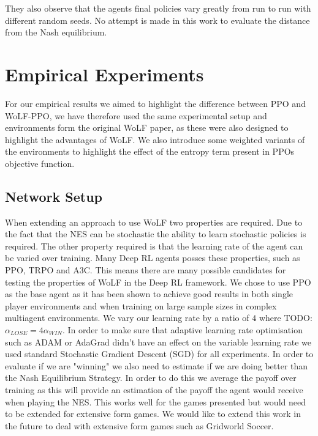 \documentclass[conference]{IEEEtran}
\newcommand\TODO[1]{{\color{red}TODO: #1}}
\begin{document}
They also observe that the agents final policies vary greatly from run to run with different random seeds. No attempt is made in this work to evaluate the distance from the Nash equilibrium. 

\section{Empirical Experiments}

For our empirical results we aimed to highlight the difference between PPO and WoLF-PPO, we have therefore used the same experimental setup and environments form the original WoLF paper, as these were also designed to highlight the advantages of WoLF. We also introduce some weighted variants of the environments to highlight the effect of the entropy term present in PPOs objective function.

\subsection{Network Setup}

When extending an approach to use WoLF two properties are required. Due to the fact that the NES can be stochastic the ability to learn stochastic policies is required. The other property required is that the learning rate of the agent can be varied over training. Many Deep RL agents posses these properties, such as PPO, TRPO and A3C. This means there are many possible candidates for testing the properties of WoLF in the Deep RL framework. We chose to use PPO as the base agent as it has been shown to achieve good results in both single player environments and when training on large sample sizes in complex multiagent environments\cite{OpenAI_dota}. We vary our learning rate by a ratio of $4$ where \TODO{$\alpha_{LOSE} = 4\alpha_{WIN}$}. In order to make sure that adaptive learning rate optimisation such as ADAM or AdaGrad didn't have an effect on the variable learning rate we used standard Stochastic Gradient Descent (SGD) for all experiments. In order to evaluate if we are "winning" we also need to estimate if we are doing better than the Nash Equilibrium Strategy. In order to do this we average the payoff over training as this will provide an estimation of the payoff the agent would receive when playing the NES. This works well for the games presented but would need to be extended for extensive form games. We would like to extend this work in the future to deal with extensive form games such as Gridworld Soccer.
\end{document}
